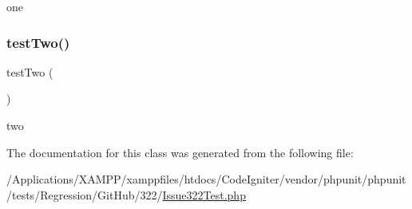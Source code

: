 one \mbox{\label{class_issue322_test_a4fb9974ce113d5d1db8075e0db0dc9b6}} 
\subsubsection{\texorpdfstring{test\+Two()}{testTwo()}}
{\footnotesize\ttfamily test\+Two (\begin{DoxyParamCaption}{ }\end{DoxyParamCaption})}

two 

The documentation for this class was generated from the following file\+:\begin{DoxyCompactItemize}
\item 
/\+Applications/\+X\+A\+M\+P\+P/xamppfiles/htdocs/\+Code\+Igniter/vendor/phpunit/phpunit/tests/\+Regression/\+Git\+Hub/322/\mbox{\hyperlink{_issue322_test_8php}{Issue322\+Test.\+php}}\end{DoxyCompactItemize}
